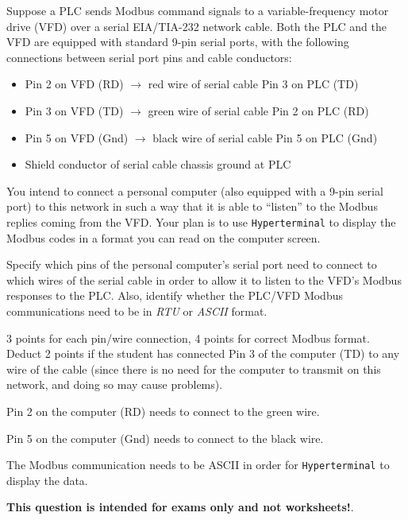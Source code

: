 

Suppose a PLC sends Modbus command signals to a variable-frequency motor drive (VFD) over a serial EIA/TIA-232 network cable.  Both the PLC and the VFD are equipped with standard 9-pin serial ports, with the following connections between serial port pins and cable conductors:

\begin{itemize}
\item{} Pin 2 on VFD (RD) $\rightarrow $ red wire of serial cable  Pin 3 on PLC (TD)
\item{} Pin 3 on VFD (TD) $\rightarrow $ green wire of serial cable  Pin 2 on PLC (RD)
\item{} Pin 5 on VFD (Gnd) $\rightarrow $ black wire of serial cable  Pin 5 on PLC (Gnd)
\item{} Shield conductor of serial cable  chassis ground at PLC
\end{itemize}

You intend to connect a personal computer (also equipped with a 9-pin serial port) to this network in such a way that it is able to ``listen'' to the Modbus replies coming from the VFD.  Your plan is to use {\tt Hyperterminal} to display the Modbus codes in a format you can read on the computer screen.

\vskip 10pt

Specify which pins of the personal computer's serial port need to connect to which wires of the serial cable in order to allow it to listen to the VFD's Modbus responses to the PLC.  Also, identify whether the PLC/VFD Modbus communications need to be in {\it RTU} or {\it ASCII} format.







3 points for each pin/wire connection, 4 points for correct Modbus format.  Deduct 2 points if the student has connected Pin 3 of the computer (TD) to any wire of the cable (since there is no need for the computer to transmit on this network, and doing so may cause problems).

\vskip 10pt

Pin 2 on the computer (RD) needs to connect to the green wire.

Pin 5 on the computer (Gnd) needs to connect to the black wire.

The Modbus communication needs to be ASCII in order for {\tt Hyperterminal} to display the data.







{\bf This question is intended for exams only and not worksheets!}.



